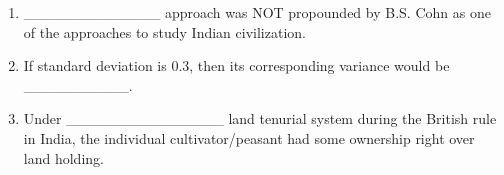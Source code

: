 \documentclass[12pt]{article}
\theoremstyle{remark}
\begin{document}
\begin{enumerate}
\begin{enumerate}
\end{enumerate}
\hfill{}
\item \_\_\_\_\_\_\_\_\_\_\_\_\_ approach was NOT propounded by B.S. Cohn as one of the approaches to study Indian civilization.
\begin{enumerate}
\end{enumerate}
\hfill{}
\item If standard deviation is 0.3, then its corresponding variance would be \_\_\_\_\_\_\_\_\_\_.
\begin{enumerate}
\end{enumerate}
\hfill{}
\item Under \_\_\_\_\_\_\_\_\_\_\_\_\_\_\_ land tenurial system during the British rule in India, the individual cultivator/peasant had some ownership right over land holding.
\begin{enumerate}
\end{enumerate}

\end{enumerate}
\end{document}
